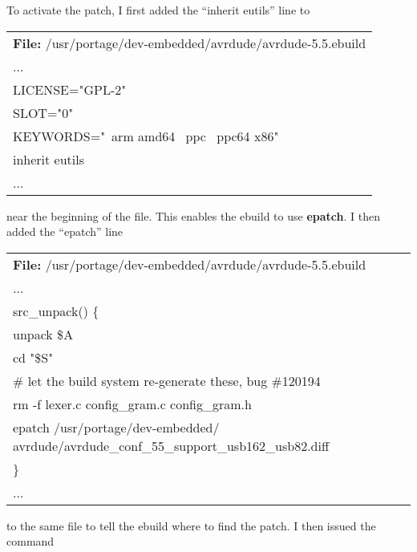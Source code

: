 To activate the patch, I first added the ``inherit eutils'' line to
\begin{center}
    \vspace{-\baselineskip}
    \begin{tabular}{|l|} \hline
        \rowcolor[gray]{0.9}
        \begin{minipage}[c]{\textwidth - 2\tabcolsep}
            \textbf{File:}
            /usr/portage/dev-embedded/avrdude/avrdude-5.5.ebuild
        \end{minipage}\\
    ...\\
    LICENSE="GPL-2"\\
    SLOT="0"\\
    KEYWORDS="~arm amd64 ~ppc ~ppc64 x86"\\
    inherit eutils\\
    ...\\
    \hline
    \end{tabular}
\end{center}
near the beginning of the file.  This enables the ebuild to use
\textbf{epatch}.  I then added the ``epatch'' line
\begin{center}
    \vspace{-\baselineskip}
    \begin{tabular}{|l|} \hline
        \rowcolor[gray]{0.9}
        \begin{minipage}[c]{\textwidth - 2\tabcolsep}
            \textbf{File:}
            /usr/portage/dev-embedded/avrdude/avrdude-5.5.ebuild
        \end{minipage}\\
    ...\\
    src\_unpack() \{    \\
        unpack \${A}    \\
        cd "\${S}"      \\
        \# let the build system re-generate these, bug \#120194 \\
        rm -f lexer.c config\_gram.c config\_gram.h \\
        epatch
        /usr/portage/dev-embedded/
        avrdude/avrdude\_conf\_55\_support\_usb162\_usb82.diff  \\
    \}  \\
    ...\\
    \hline
    \end{tabular}
\end{center}
to the same file to tell the ebuild where to find the patch.  I then
issued the command
